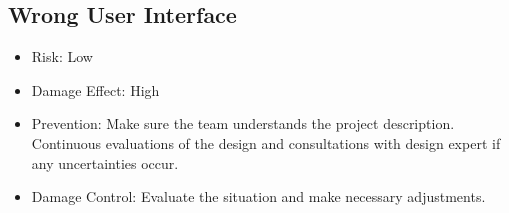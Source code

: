 \documentclass[a4paper]{article}
\begin{document}
\subsection{Wrong User Interface}
\begin{itemize}
\item Risk: Low
\item Damage Effect: High
\item Prevention: Make sure the team understands the project description. Continuous evaluations of the design and consultations with design expert if any uncertainties occur.
\item Damage Control: Evaluate the situation and make necessary adjustments. 
\end{itemize}
\end{document}
